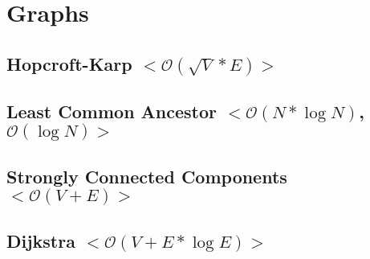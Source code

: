 \documentclass[10pt, a4paper, twoside, notitlepage]{article}
\begin{document}
\begin{titlepage}
\maketitle
\tableofcontents
\alignbottom{\doclicenseThis}
\end{titlepage}


%
%
%
%

\section{Graphs}

\subsection{Hopcroft-Karp $<\mathcal{O}(\sqrt{V}*E)>$}



\newpage

\subsection{Least Common Ancestor $<\mathcal{O}(N*\log N)$, $\mathcal{O}(\log N)>$}



\newpage

\subsection{Strongly Connected Components $<\mathcal{O}(V+E)>$}



\newpage

\subsection{Dijkstra $<\mathcal{O}(V+E*\log E)>$}
\end{document}
